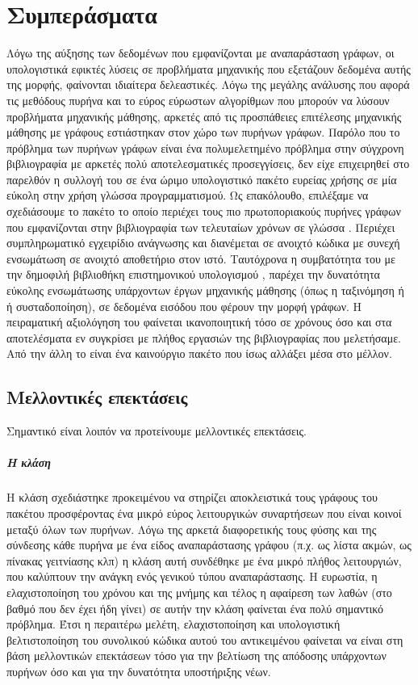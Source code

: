 \chapter{Συμπεράσματα}
\label{chap5}
Λόγω της αύξησης των δεδομένων που εμφανίζονται με αναπαράσταση γράφων, οι υπολογιστικά εφικτές λύσεις σε προβλήματα μηχανικής που εξετάζουν δεδομένα αυτής της μορφής, φαίνονται ιδιαίτερα δελεαστικές.
Λόγω της μεγάλης ανάλυσης που αφορά τις μεθόδους πυρήνα και το εύρος εύρωστων αλγορίθμων που μπορούν να λύσουν προβλήματα μηχανικής μάθησης, αρκετές από τις προσπάθειες επιτέλεσης μηχανικής μάθησης με γράφους εστιάστηκαν στον χώρο των πυρήνων γράφων.
Παρόλο που το πρόβλημα των πυρήνων γράφων είναι ένα πολυμελετημένο πρόβλημα στην σύγχρονη βιβλιογραφία με αρκετές πολύ αποτελεσματικές προσεγγίσεις, δεν είχε επιχειρηθεί στο παρελθόν η συλλογή του σε ένα ώριμο υπολογιστικό πακέτο ευρείας χρήσης σε μία εύκολη στην χρήση γλώσσα προγραμματισμού.
Ως επακόλουθο, επιλέξαμε να σχεδιάσουμε το πακέτο  το οποίο περιέχει τους πιο πρωτοποριακούς πυρήνες γράφων που εμφανίζονται στην βιβλιογραφία των τελευταίων χρόνων σε γλώσσα .
Περιέχει συμπληρωματικό εγχειρίδιο ανάγνωσης και διανέμεται σε ανοιχτό κώδικα με συνεχή ενσωμάτωση σε ανοιχτό αποθετήριο στον ιστό.
Ταυτόχρονα η συμβατότητα του με την δημοφιλή βιβλιοθήκη επιστημονικού υπολογισμού , παρέχει την δυνατότητα εύκολης ενσωμάτωσης υπάρχοντων έργων μηχανικής μάθησης (όπως η ταξινόμηση ή ή συσταδοποίηση), σε δεδομένα εισόδου που φέρουν την μορφή γράφων.
Η πειραματική αξιολόγηση του  φαίνεται ικανοποιητική τόσο σε χρόνους όσο και στα αποτελέσματα εν συγκρίσει με πλήθος εργασιών της βιβλιογραφίας που μελετήσαμε.
Από την άλλη το  είναι ένα καινούργιο πακέτο που ίσως αλλάξει μέσα στο μέλλον.
\section{Μελλοντικές επεκτάσεις}
Σημαντικό είναι λοιπόν να προτείνουμε μελλοντικές επεκτάσεις.
\paragraph*{Η κλάση }
Η κλάση  σχεδιάστηκε προκειμένου να στηρίζει αποκλειστικά τους γράφους του πακέτου προσφέροντας ένα μικρό εύρος λειτουργικών συναρτήσεων που είναι κοινοί μεταξύ όλων των πυρήνων.
Λόγω της αρκετά διαφορετικής τους φύσης και της σύνδεσης κάθε πυρήνα με ένα είδος αναπαράστασης γράφου (π.χ. ως λίστα ακμών, ως πίνακας γειτνίασης κλπ) η κλάση αυτή συνδέθηκε με ένα μικρό πλήθος λειτουργιών, που καλύπτουν την ανάγκη ενός γενικού τύπου αναπαράστασης.
Η ευρωστία, η ελαχιστοποίηση του χρόνου και της μνήμης και τέλος η αφαίρεση των λαθών (στο βαθμό που δεν έχει ήδη γίνει) σε αυτήν την κλάση φαίνεται ένα πολύ σημαντικό πρόβλημα.
Έτσι η περαιτέρω μελέτη, ελαχιστοποίηση και υπολογιστική βελτιστοποίηση του συνολικού κώδικα αυτού του αντικειμένου φαίνεται να είναι στη βάση μελλοντικών επεκτάσεων τόσο για την βελτίωση της απόδοσης υπάρχοντων πυρήνων όσο και για την δυνατότητα υποστήριξης νέων.
